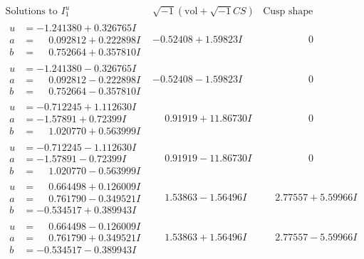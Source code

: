 \documentclass[1p]{elsarticle_modified}
\theoremstyle{definition}
\newcommand{\I}{\sqrt{-1}}
\begin{document}
$$\begin{array}{c|c|c}
\text{Solutions to }I^u_{1}& \I (\text{vol} + \sqrt{-1}CS) & \text{Cusp shape}\\
 \hline 
\begin{aligned}
u &= -1.241380 + 0.326765 I \\
a &= \phantom{-}0.092812 + 0.222898 I \\
b &= \phantom{-}0.752664 + 0.357810 I\end{aligned}
 & -0.52408 + 1.59823 I & \phantom{-0.000000 } 0 \\ \hline\begin{aligned}
u &= -1.241380 - 0.326765 I \\
a &= \phantom{-}0.092812 - 0.222898 I \\
b &= \phantom{-}0.752664 - 0.357810 I\end{aligned}
 & -0.52408 - 1.59823 I & \phantom{-0.000000 } 0 \\ \hline\begin{aligned}
u &= -0.712245 + 1.112630 I \\
a &= -1.57891 + 0.72399 I \\
b &= \phantom{-}1.020770 + 0.563999 I\end{aligned}
 & \phantom{-}0.91919 + 11.86730 I & \phantom{-0.000000 } 0 \\ \hline\begin{aligned}
u &= -0.712245 - 1.112630 I \\
a &= -1.57891 - 0.72399 I \\
b &= \phantom{-}1.020770 - 0.563999 I\end{aligned}
 & \phantom{-}0.91919 - 11.86730 I & \phantom{-0.000000 } 0 \\ \hline\begin{aligned}
u &= \phantom{-}0.664498 + 0.126009 I \\
a &= \phantom{-}0.761790 - 0.349521 I \\
b &= -0.534517 + 0.389943 I\end{aligned}
 & \phantom{-}1.53863 - 1.56496 I & \phantom{-}2.77557 + 5.59966 I \\ \hline\begin{aligned}
u &= \phantom{-}0.664498 - 0.126009 I \\
a &= \phantom{-}0.761790 + 0.349521 I \\
b &= -0.534517 - 0.389943 I\end{aligned}
 & \phantom{-}1.53863 + 1.56496 I & \phantom{-}2.77557 - 5.59966 I \\ \hline\begin{aligned}

\end{aligned}
\end{array}$$
\end{document}
